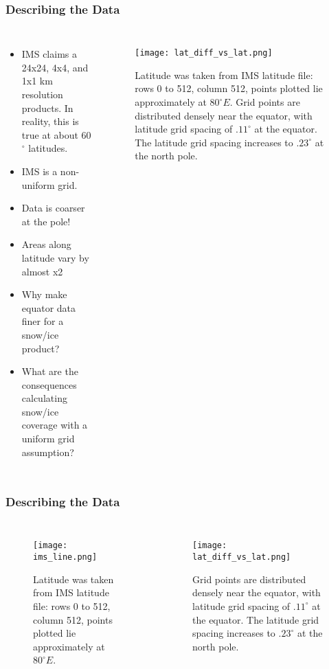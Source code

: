 \begin{frame}
\frametitle{Describing the Data}
\begin{columns}
\begin{itemize}
    \item IMS claims a 24x24, 4x4, and 1x1 km resolution products. In reality, this is true at about 60$^\circ$ latitudes.
    \item IMS is a non-uniform grid.
    \item Data is coarser at the pole!
    \item Areas along latitude vary by almost x2
    \item Why make equator data finer for a snow/ice product?
    \item What are the consequences calculating snow/ice coverage with a uniform grid assumption?
\end{itemize}

\begin{figure}[ht]
\vspace*{-.5cm}
\centering
\begin{minipage}{1\linewidth}
\texttt{[image: lat\_diff\_vs\_lat.png]}
\caption{\tiny{Latitude was taken from IMS latitude file: rows 0 to 512, column 512, points plotted lie approximately at $80^{\circ}E$. Grid points are distributed densely near the equator, with latitude grid spacing of $.11^{\circ}$ at the equator. The latitude grid spacing increases to $.23^{\circ}$ at the north pole.}}
\end{minipage}
\end{figure}
\end{columns}
\end{frame}

\begin{frame}
\frametitle{Describing the Data}
\begin{columns}
\begin{figure}
\centering
\vspace*{-.6cm}
\begin{minipage}{1\linewidth}
\texttt{[image: ims\_line.png]}
\caption{\tiny{Latitude was taken from IMS latitude file: rows 0 to 512, column 512, points plotted lie approximately at $80^{\circ}E$. }}\end{minipage}
\end{figure}

\begin{figure}
\centering
\begin{minipage}{1\linewidth}
\texttt{[image: lat\_diff\_vs\_lat.png]}
\caption{\tiny{Grid points are distributed densely near the equator, with latitude grid spacing of $.11^{\circ}$ at the equator. The latitude grid spacing increases to $.23^{\circ}$ at the north pole.}}
\end{minipage}
\end{figure}

\end{columns}
\end{frame}

